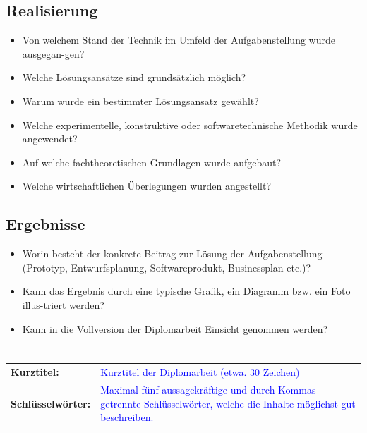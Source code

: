 \documentclass[12pt]{article}
\begin{document}
\subsection*{Realisierung}
\begin{itemize}
    \item Von welchem Stand der Technik im Umfeld der Aufgabenstellung wurde ausgegan-gen?
    \item Welche Lösungsansätze sind grundsätzlich möglich?
    \item Warum wurde ein bestimmter Lösungsansatz gewählt?
    \item Welche experimentelle, konstruktive oder softwaretechnische Methodik wurde angewendet?
    \item Auf welche fachtheoretischen Grundlagen wurde aufgebaut?
    \item Welche wirtschaftlichen Überlegungen wurden angestellt?
\end{itemize}

\subsection*{Ergebnisse}
\begin{itemize}
    \item Worin besteht der konkrete Beitrag zur Lösung der Aufgabenstellung (Prototyp, Entwurfsplanung, Softwareprodukt, Businessplan etc.)?
    \item Kann das Ergebnis durch eine typische Grafik, ein Diagramm bzw. ein Foto illus-triert werden?
    \item Kann in die Vollversion der Diplomarbeit Einsicht genommen werden?
\end{itemize}

\color{black}
\vspace*{\fill}
\section*{}

\bgroup
    \def\arraystretch{1.5}
    \begin{tabular}{p{48mm}p{113mm}}
        \textbf{Kurztitel:} & \textcolor{blue}{Kurztitel der Diplomarbeit (etwa. 30 Zeichen)}\\
        \textbf{Schlüsselwörter:} & \textcolor{blue}{Maximal fünf aussagekräftige und durch Kommas getrennte Schlüsselwörter, welche die Inhalte möglichst gut beschreiben.}
    \end{tabular}
\egroup
\end{document}
